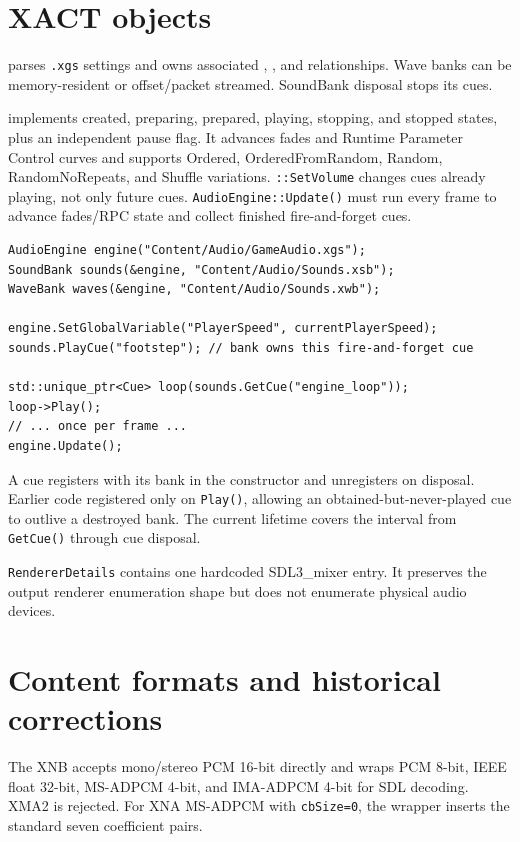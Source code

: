 \section{XACT objects}

 parses \texttt{.xgs} settings and owns associated
, , and  relationships. Wave banks can be
memory-resident or offset/packet streamed. SoundBank disposal stops its cues.

 implements created, preparing, prepared, playing, stopping, and stopped states,
plus an independent pause flag. It advances fades and Runtime Parameter Control curves and
supports Ordered, OrderedFromRandom, Random, RandomNoRepeats, and Shuffle variations.
\texttt{::SetVolume} changes cues already playing, not only future
cues. \texttt{AudioEngine::Update()} must run every frame to advance fades/RPC state and collect
finished fire-and-forget cues.

\begin{lstlisting}
AudioEngine engine("Content/Audio/GameAudio.xgs");
SoundBank sounds(&engine, "Content/Audio/Sounds.xsb");
WaveBank waves(&engine, "Content/Audio/Sounds.xwb");

engine.SetGlobalVariable("PlayerSpeed", currentPlayerSpeed);
sounds.PlayCue("footstep"); // bank owns this fire-and-forget cue

std::unique_ptr<Cue> loop(sounds.GetCue("engine_loop"));
loop->Play();
// ... once per frame ...
engine.Update();
\end{lstlisting}

A cue registers with its bank in the constructor and unregisters on disposal. Earlier code
registered only on \texttt{Play()}, allowing an obtained-but-never-played cue to outlive a
destroyed bank. The current lifetime covers the interval from \texttt{GetCue()} through cue
disposal.

\texttt{RendererDetails} contains one hardcoded SDL3\_mixer entry. It preserves the output
renderer enumeration shape but does not enumerate physical audio devices.

\section{Content formats and historical corrections}

The XNB  accepts mono/stereo PCM 16-bit directly and wraps PCM
8-bit, IEEE float 32-bit, MS-ADPCM 4-bit, and IMA-ADPCM 4-bit for SDL decoding. XMA2 is rejected.
For XNA MS-ADPCM with \texttt{cbSize=0}, the wrapper inserts the standard seven coefficient
pairs.

